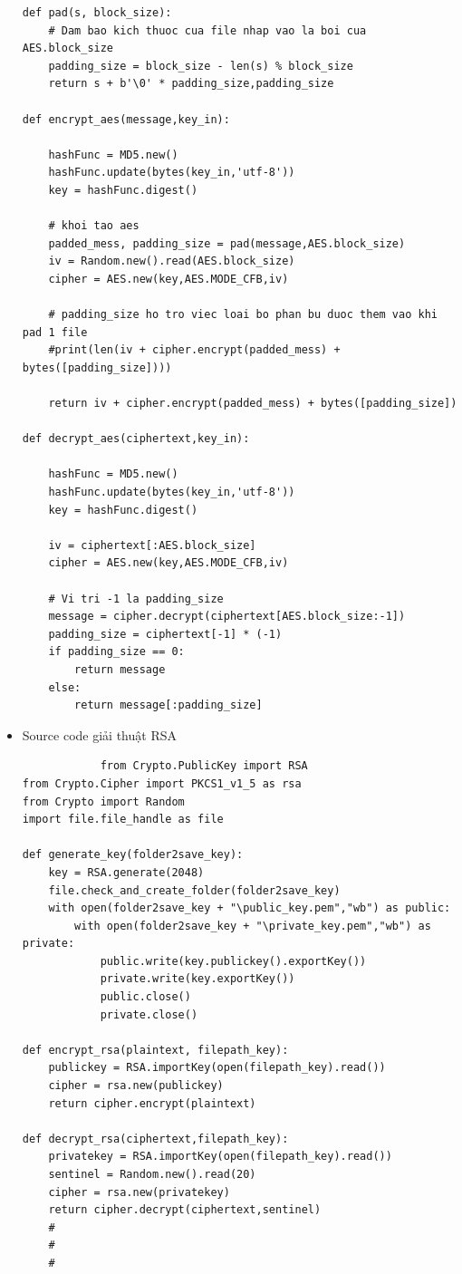 \documentclass[a4paper]{article}
\begin{document}
\begin{itemize}
\begin{lstlisting}
def pad(s, block_size):
    # Dam bao kich thuoc cua file nhap vao la boi cua AES.block_size
    padding_size = block_size - len(s) % block_size
    return s + b'\0' * padding_size,padding_size

def encrypt_aes(message,key_in):

    hashFunc = MD5.new()
    hashFunc.update(bytes(key_in,'utf-8'))
    key = hashFunc.digest()

    # khoi tao aes
    padded_mess, padding_size = pad(message,AES.block_size)
    iv = Random.new().read(AES.block_size)
    cipher = AES.new(key,AES.MODE_CFB,iv)
    
    # padding_size ho tro viec loai bo phan bu duoc them vao khi pad 1 file
    #print(len(iv + cipher.encrypt(padded_mess) + bytes([padding_size])))
    
    return iv + cipher.encrypt(padded_mess) + bytes([padding_size])

def decrypt_aes(ciphertext,key_in):

    hashFunc = MD5.new()
    hashFunc.update(bytes(key_in,'utf-8'))
    key = hashFunc.digest()

    iv = ciphertext[:AES.block_size]
    cipher = AES.new(key,AES.MODE_CFB,iv)

    # Vi tri -1 la padding_size
    message = cipher.decrypt(ciphertext[AES.block_size:-1])
    padding_size = ciphertext[-1] * (-1)
    if padding_size == 0:
        return message
    else:
        return message[:padding_size]
			\end{lstlisting}
			\item
	Source code giải thuật RSA
			\begin{lstlisting}
			from Crypto.PublicKey import RSA
from Crypto.Cipher import PKCS1_v1_5 as rsa
from Crypto import Random
import file.file_handle as file

def generate_key(folder2save_key):
    key = RSA.generate(2048)
    file.check_and_create_folder(folder2save_key)
    with open(folder2save_key + "\public_key.pem","wb") as public:
        with open(folder2save_key + "\private_key.pem","wb") as private:
            public.write(key.publickey().exportKey())
            private.write(key.exportKey())
            public.close()
            private.close()

def encrypt_rsa(plaintext, filepath_key):
    publickey = RSA.importKey(open(filepath_key).read())
    cipher = rsa.new(publickey)
    return cipher.encrypt(plaintext)

def decrypt_rsa(ciphertext,filepath_key):
    privatekey = RSA.importKey(open(filepath_key).read())
    sentinel = Random.new().read(20)
    cipher = rsa.new(privatekey)
    return cipher.decrypt(ciphertext,sentinel)
    #
    #
    #
    

\end{lstlisting}
\end{itemize}
\end{document}
